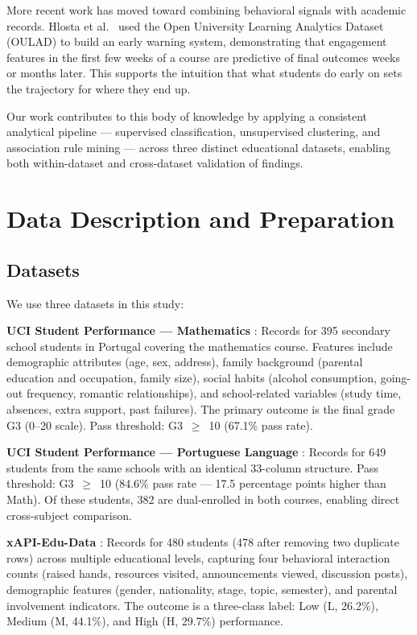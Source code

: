 \documentclass[conference]{IEEEtran}
\begin{document}
More recent work has moved toward combining behavioral signals with academic records. Hlosta et al.~\cite{hlosta2017ouroboros} used the Open University Learning Analytics Dataset (OULAD) to build an early warning system, demonstrating that engagement features in the first few weeks of a course are predictive of final outcomes weeks or months later. This supports the intuition that what students do early on sets the trajectory for where they end up.

Our work contributes to this body of knowledge by applying a consistent analytical pipeline — supervised classification, unsupervised clustering, and association rule mining — across three distinct educational datasets, enabling both within-dataset and cross-dataset validation of findings.

\section{Data Description and Preparation}

\subsection{Datasets}

We use three datasets in this study:

\textbf{UCI Student Performance — Mathematics} \cite{cortez2008using}: Records for 395 secondary school students in Portugal covering the mathematics course. Features include demographic attributes (age, sex, address), family background (parental education and occupation, family size), social habits (alcohol consumption, going-out frequency, romantic relationships), and school-related variables (study time, absences, extra support, past failures). The primary outcome is the final grade G3 (0–20 scale). Pass threshold: G3~$\geq$~10 (67.1\% pass rate).

\textbf{UCI Student Performance — Portuguese Language} \cite{cortez2008using}: Records for 649 students from the same schools with an identical 33-column structure. Pass threshold: G3~$\geq$~10 (84.6\% pass rate — 17.5 percentage points higher than Math). Of these students, 382 are dual-enrolled in both courses, enabling direct cross-subject comparison.

\textbf{xAPI-Edu-Data} \cite{amrieh2016mining}: Records for 480 students (478 after removing two duplicate rows) across multiple educational levels, capturing four behavioral interaction counts (raised hands, resources visited, announcements viewed, discussion posts), demographic features (gender, nationality, stage, topic, semester), and parental involvement indicators. The outcome is a three-class label: Low (L, 26.2\%), Medium (M, 44.1\%), and High (H, 29.7\%) performance.
\end{document}
